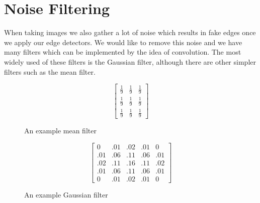 \documentclass{article}
\begin{document}
	\section{Noise Filtering}
	When taking images we also gather a lot of noise which results in fake edges once we apply our edge detectors. We would like to remove this noise and we have many filters which can be implemented by the idea of convolution. The most widely used of these filters is the Gaussian filter, although there are other simpler filters such as the mean filter.
	\begin{figure}[ht]
	\begin{minipage}{.5\textwidth}
			\begingroup
			\renewcommand*{\arraystretch}{1.7}	
			\centering
			\[ \begin{bmatrix} \frac{1}{9} & \frac{1}{9} & \frac{1}{9} \\
								\frac{1}{9} & \frac{1}{9} & \frac{1}{9} \\
								\frac{1}{9} & \frac{1}{9} & \frac{1}{9}
			\end{bmatrix} \]
			\endgroup
			\caption{An example mean filter}
			\label{fig:mean filter}
	\end{minipage}
	\begin{minipage}{.5\textwidth}
		\centering
		\[ \begin{bmatrix} 0 & .01 & .02 & .01 & 0 \\
								.01 & .06 & .11 & .06 & .01 \\ 
							    .02 & .11 & .16 & .11 & .02 \\
							    .01 & .06 & .11 & .06 & .01 \\
							    0 & .01 & .02 & .01 & 0
				\end{bmatrix} \]
		\caption{An example Gaussian filter}
		\label{fig:gaussian filter}

	\end{minipage}
	\end{figure}
	
\end{document}
